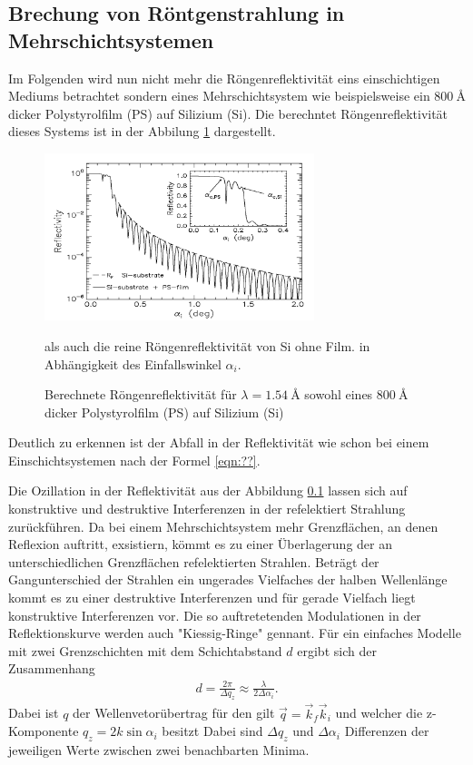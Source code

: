 \subsection{Brechung von Röntgenstrahlung in Mehrschichtsystemen}
\label{subsec:mehrschicht}
Im Folgenden wird nun nicht mehr
die Röngenreflektivität
eins einschichtigen
Mediums betrachtet sondern eines Mehrschichtsystem wie
beispielsweise ein $\SI{800}{\angstrom}$ dicker Polystyrolfilm (PS)
auf Silizium (Si). Die berechntet Röngenreflektivität dieses
Systems ist in der Abbilung \ref{fig:mehrschicht} dargestellt.

\begin{figure}
\centering
\includegraphics[width = 0.7\textwidth]{bilder/mehrschicht_beispiel.PNG}
\caption{Berechnete Röngenreflektivität für $\lambda=\SI{1.54}{\angstrom} $ sowohl eines
$\SI{800}{\angstrom}$ dicker Polystyrolfilm (PS)
auf Silizium (Si)} als auch die reine Röngenreflektivität von Si ohne Film.
in Abhängigkeit des Einfallswinkel $\alpha_i$.\cite{sample}
\label{fig:mehrschicht}
\end{figure}

Deutlich zu erkennen ist der Abfall in der Reflektivität wie schon
bei einem Einschichtsystemen nach der Formel \eqref{eqn:??}.

Die Ozillation in der Reflektivität aus der Abbildung \ref{subsec:mehrschicht}
lassen sich auf konstruktive und destruktive Interferenzen in
der refelektiert Strahlung zurückführen.
Da bei einem Mehrschichtsystem mehr
Grenzflächen, an denen Reflexion auftritt, exsistiern,
kömmt es zu einer Überlagerung der an unterschiedlichen Grenzflächen
refelektierten Strahlen.
Beträgt der Gangunterschied der Strahlen
ein ungerades Vielfaches der halben Wellenlänge
kommt es zu einer destruktive Interferenzen und für gerade Vielfach
liegt konstruktive Interferenzen vor.
Die so auftretetenden
Modulationen in der Reflektionskurve
werden auch "Kiessig-Ringe" gennant.
Für ein einfaches Modelle mit zwei
Grenzschichten mit dem Schichtabstand $d$
ergibt sich der Zusammenhang
\begin{align}
  d = \frac{2\pi}{\Delta q_z} \approx \frac{\lambda}{2\Delta \alpha_i}.
\end{align}
Dabei ist $q$ der Wellenvetorübertrag für den gilt
$\vec{q} = \vec{k}_f \vec{k}_i$ und welcher die z-Komponente $q_z=2k\sin \alpha_i$ besitzt
Dabei sind $\Delta q_z$ und $\Delta\alpha_i$ Differenzen
der jeweiligen
Werte zwischen zwei benachbarten Minima. %

